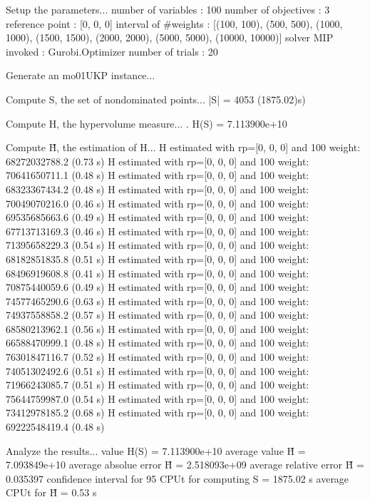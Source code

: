 Setup the parameters...
  number of variables  : 100
  number of objectives : 3
  reference point      : [0, 0, 0]
  interval of #weights : [(100, 100), (500, 500), (1000, 1000), (1500, 1500), (2000, 2000), (5000, 5000), (10000, 10000)]
  solver MIP invoked   : Gurobi.Optimizer
  number of trials     : 20

Generate an mo01UKP instance...

Compute S, the set of nondominated points...
  |S|  = 4053 (1875.02)s)

Compute H, the hypervolume measure...
. H(S) = 7.113900e+10

Compute H̃, the estimation of H...
  H estimated with rp=[0, 0, 0] and 100 weight:  68272032788.2  (0.73 s)
  H estimated with rp=[0, 0, 0] and 100 weight:  70641650711.1  (0.48 s)
  H estimated with rp=[0, 0, 0] and 100 weight:  68323367434.2  (0.48 s)
  H estimated with rp=[0, 0, 0] and 100 weight:  70049070216.0  (0.46 s)
  H estimated with rp=[0, 0, 0] and 100 weight:  69535685663.6  (0.49 s)
  H estimated with rp=[0, 0, 0] and 100 weight:  67713713169.3  (0.46 s)
  H estimated with rp=[0, 0, 0] and 100 weight:  71395658229.3  (0.54 s)
  H estimated with rp=[0, 0, 0] and 100 weight:  68182851835.8  (0.51 s)
  H estimated with rp=[0, 0, 0] and 100 weight:  68496919608.8  (0.41 s)
  H estimated with rp=[0, 0, 0] and 100 weight:  70875440059.6  (0.49 s)
  H estimated with rp=[0, 0, 0] and 100 weight:  74577465290.6  (0.63 s)
  H estimated with rp=[0, 0, 0] and 100 weight:  74937558858.2  (0.57 s)
  H estimated with rp=[0, 0, 0] and 100 weight:  68580213962.1  (0.56 s)
  H estimated with rp=[0, 0, 0] and 100 weight:  66588470999.1  (0.48 s)
  H estimated with rp=[0, 0, 0] and 100 weight:  76301847116.7  (0.52 s)
  H estimated with rp=[0, 0, 0] and 100 weight:  74051302492.6  (0.51 s)
  H estimated with rp=[0, 0, 0] and 100 weight:  71966243085.7  (0.51 s)
  H estimated with rp=[0, 0, 0] and 100 weight:  75644759987.0  (0.54 s)
  H estimated with rp=[0, 0, 0] and 100 weight:  73412978185.2  (0.68 s)
  H estimated with rp=[0, 0, 0] and 100 weight:  69222548419.4  (0.48 s)

Analyze the results...
  value H(S)                  = 7.113900e+10 
  average value H̃             = 7.093849e+10 
  average absolue error H̃     = 2.518093e+09 
  average relative error H̃    = 0.035397 
  confidence interval for 95%
  CPUt for computing S         = 1875.02 s
  average CPUt for H̃           = 0.53 s

